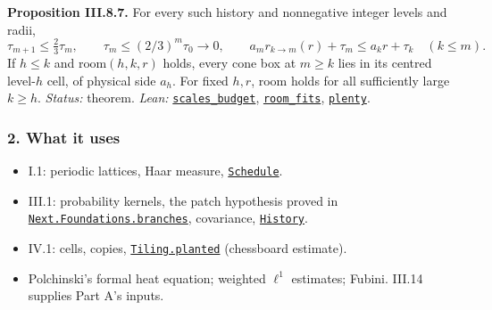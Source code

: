 \documentclass[
  letterpaper,
  11pt]{article}
\providecommand{\tightlist}{%
  \setlength{\itemsep}{0pt}\setlength{\parskip}{0pt}}
\begin{document}
\textbf{Proposition III.8.7.} For every such history and nonnegative
integer levels and radii,
\[\tau_{m+1}\le\tfrac23\tau_m,\qquad\tau_m\le(2/3)^m\tau_0\to0,\qquad a_mr_{k\to m}(r)+\tau_m\le a_kr+\tau_k\quad(k\le m).\]
If \(h\le k\) and \(\mathrm{room}(h,k,r)\) holds, every cone box at
\(m\ge k\) lies in its centred level-\(h\) cell, of physical side
\(a_h\). For fixed \(h,r\), room holds for all sufficiently large
\(k\ge h\). \emph{Status:} theorem. \emph{Lean:}
\href{https://github.com/yang-mills-group/OpenAI-YM-20261028/blob/3456e5e75cf8d4cd558955a5c7638fba2d68f464/YM/Push/GRID_APPROXIMATION/Geometry.lean\#L147-L150}{\texttt{scales\_budget}},
\href{https://github.com/yang-mills-group/OpenAI-YM-20261028/blob/3456e5e75cf8d4cd558955a5c7638fba2d68f464/YM/Push/GRID_APPROXIMATION/Geometry.lean\#L160-L169}{\texttt{room\_fits}},
\href{https://github.com/yang-mills-group/OpenAI-YM-20261028/blob/3456e5e75cf8d4cd558955a5c7638fba2d68f464/YM/Push/GRID_APPROXIMATION/Geometry.lean\#L155-L158}{\texttt{plenty}}.

\subsubsection{2. What it uses}\label{what-it-uses-10}

\begin{itemize}
\tightlist
\item
  I.1: periodic lattices, Haar measure,
  \href{https://github.com/yang-mills-group/OpenAI-YM-20261028/blob/3456e5e75cf8d4cd558955a5c7638fba2d68f464/YM/Lattice/Scale.lean\#L28-L34}{\texttt{Schedule}}.
\item
  III.1: probability kernels, the patch hypothesis proved in
  \href{https://github.com/yang-mills-group/OpenAI-YM-20261028/blob/3456e5e75cf8d4cd558955a5c7638fba2d68f464/YM/Next/FOUNDATIONS/Primary.lean\#L70-L71}{\texttt{Next.Foundations.branches}},
  covariance,
  \href{https://github.com/yang-mills-group/OpenAI-YM-20261028/blob/3456e5e75cf8d4cd558955a5c7638fba2d68f464/YM/RG/History.lean\#L204-L206}{\texttt{History}}.
\item
  IV.1: cells, copies,
  \href{https://github.com/yang-mills-group/OpenAI-YM-20261028/blob/3456e5e75cf8d4cd558955a5c7638fba2d68f464/YM/Cells/Embedded.lean\#L25-L38}{\texttt{Tiling.planted}}
  (chessboard estimate).
\item
  Polchinski's formal heat equation; weighted \(\ell^1\) estimates;
  Fubini. III.14 supplies Part A's inputs.
\end{itemize}
\end{document}
